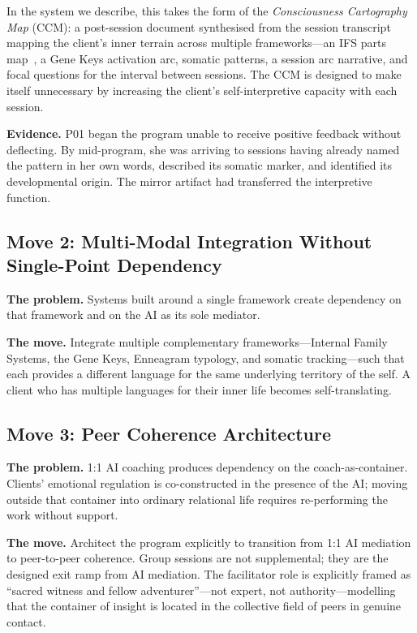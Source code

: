 \documentclass[sigchi,review,anonymous]{acmart}
\begin{document}
In the system we describe, this takes the form of the \emph{Consciousness Cartography Map}
(CCM): a post-session document synthesised from the session transcript mapping the client's
inner terrain across multiple frameworks---an IFS parts map~\cite{schwartz2001ifs}, a Gene
Keys activation arc, somatic patterns, a session arc narrative, and focal questions for the
interval between sessions. The CCM is designed to make itself unnecessary by increasing the client's
self-interpretive capacity with each session.

\textbf{Evidence.} P01 began the program unable to receive positive feedback without
deflecting. By mid-program, she was arriving to sessions having already named the pattern in
her own words, described its somatic marker, and identified its developmental origin. The
mirror artifact had transferred the interpretive function.

\subsection{Move 2: Multi-Modal Integration Without Single-Point Dependency}

\textbf{The problem.} Systems built around a single framework create dependency on that
framework and on the AI as its sole mediator.

\textbf{The move.} Integrate multiple complementary frameworks---Internal Family Systems,
the Gene Keys, Enneagram typology, and somatic tracking---such that each provides a different
language for the same underlying territory of the self. A client who has multiple languages
for their inner life becomes self-translating.

\subsection{Move 3: Peer Coherence Architecture}

\textbf{The problem.} 1:1 AI coaching produces dependency on the coach-as-container.
Clients' emotional regulation is co-constructed in the presence of the AI; moving outside
that container into ordinary relational life requires re-performing the work without support.

\textbf{The move.} Architect the program explicitly to transition from 1:1 AI mediation to
peer-to-peer coherence. Group sessions are not supplemental; they are the designed exit ramp
from AI mediation. The facilitator role is explicitly framed as ``sacred witness and fellow
adventurer''---not expert, not authority---modelling that the container of insight is located
in the collective field of peers in genuine contact.
\end{document}
